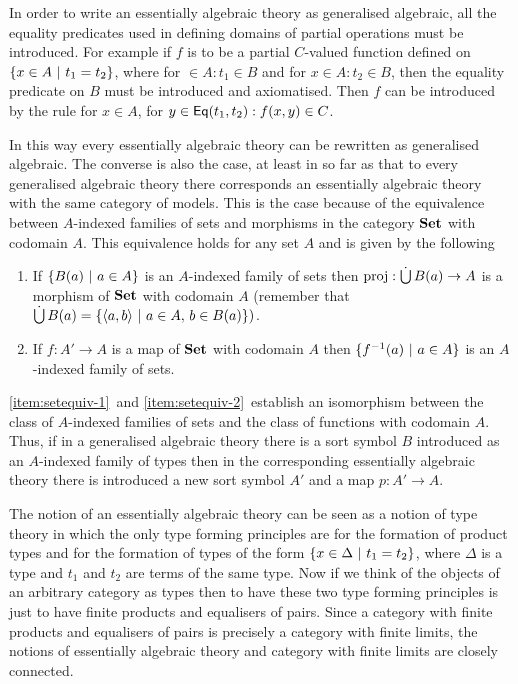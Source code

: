 In order to write an essentially algebraic theory as generalised algebraic, all the equality predicates used in defining domains of partial operations must be introduced.
%
For example if $f$ is to be a partial $C$-valued function defined on $\{ x \in A \ |\  t_1 = t_2 \}$, where for $ \in A : t_1 \in B$ and for $x \in A : t_2 \in B$, then the equality predicate on $B$ must be introduced and axiomatised.
%
Then $f$ can be introduced by the rule for $x \in A$, for $y \in \mathsf{Eq}(t_1,t_2) : f(x,y) \in C$.


In this way every essentially algebraic theory can be rewritten as generalised algebraic.
%
The converse is also the case, at least in so far as that to every generalised algebraic theory there corresponds an essentially algebraic theory with the same category of models.
%
This is the case because of the equivalence between $A$-indexed families of sets and morphisms in the category $\mathbf{Set}$ with codomain $A$.
%
This equivalence holds for any set $A$ and is given by the following

\begin{enumerate}[1.]
 	\item \label{item:setequiv-1} If $\{ B(a) \ |\  a \in A \}$ is an $A$-indexed family of sets then $\operatorname{proj} : \mathop{\dot{\bigcup}} B(a) \to A$ is a morphism of $\mathbf{Set}$ with codomain $A$ (remember that $\mathop{\dot{\bigcup}} B(a) = \{\langle a,b \rangle \ |\  a \in A,\, b \in B(a) \})$.
	\item \label{item:setequiv-2} If $f : A' \to A$ is a map of $\mathbf{Set}$ with codomain $A$ then $\{ f^{-1}(a) \ |\  a \in A \}$ is an $A$-indexed family of sets.
\end{enumerate}	

\ref{item:setequiv-1}~and \ref{item:setequiv-2}~establish an isomorphism between the class of $A$-indexed families of sets and the class of functions with codomain $A$.
%
%
Thus, if in a generalised algebraic theory there is a sort symbol $B$ introduced as an $A$-indexed family of types then in the corresponding essentially algebraic theory there is introduced a new sort symbol $A'$ and a map $p : A' \to A$.

The notion of an essentially algebraic theory can be seen as a notion of type theory in which the only type forming principles are for the formation of product types and for the formation of types of the form $\{ x \in \Delta \ |\  t_1 = t_2 \}$, where $\Delta$ is a type and $t_1$ and $t_2$ are terms of the same type.
%
Now if we think of the objects of an arbitrary category as types then to have these two type forming principles is just to have finite products and equalisers of pairs.
%
%
Since a category with finite products and equalisers of pairs is precisely a category with finite limits, the notions of essentially algebraic theory and category with finite limits are closely connected.

